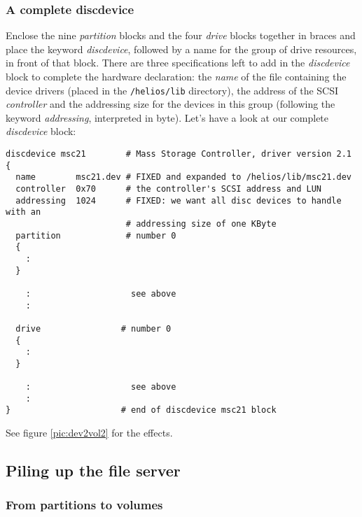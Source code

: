 \subsubsection{A complete discdevice} \label{sec:complete_dd}

Enclose the nine {\it partition} blocks and the four {\it drive} blocks
together in braces and place the keyword
{\it discdevice}, followed by a name for
the group of drive resources, in front of that block. There are three
specifications left to add in the {\it discdevice} block to complete the hardware
declaration: the {\it name} of the file containing the
device drivers (placed in the {\tt /helios/lib} directory), the address of the
SCSI {\it controller} and the addressing
size for the devices in this group (following the keyword
{\it addressing}, interpreted in byte).
Let's have a look at our complete {\it discdevice} block:

\begin{listing}
  \begin{verbatim}
discdevice msc21        # Mass Storage Controller, driver version 2.1
{
  name        msc21.dev # FIXED and expanded to /helios/lib/msc21.dev
  controller  0x70      # the controller's SCSI address and LUN
  addressing  1024      # FIXED: we want all disc devices to handle with an
                        # addressing size of one KByte
  partition             # number 0
  {
    :
  }

    :                    see above
    :

  drive                # number 0     
  {
    :
  }
    
    :                    see above
    :
}                      # end of discdevice msc21 block
  \end{verbatim}
\end{listing}

See figure \ref{pic:dev2vol2} for the effects.


\subsection{Piling up the file server}

\subsubsection{From partitions to volumes}

